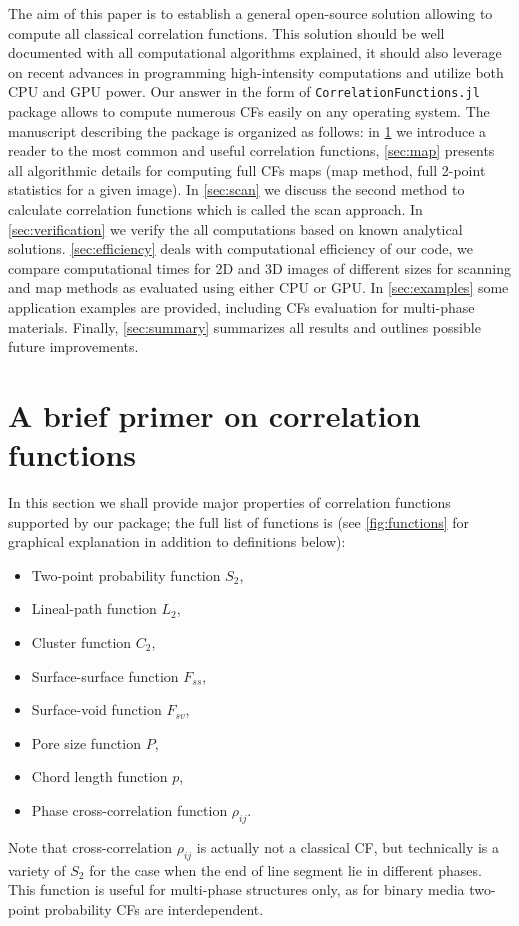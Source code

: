 \documentclass[1p]{elsarticle}
\newcommand{\code}[1]{\colorbox{light-gray}{\texttt{#1}}}
\begin{document}
The aim of this paper is to establish a general open-source solution allowing to
compute all classical correlation functions. This solution should be well
documented with all computational algorithms explained, it should also leverage
on recent advances in programming high-intensity computations and utilize both
CPU and GPU power. Our answer in the form of \code{CorrelationFunctions.jl}
package allows to compute numerous CFs easily on any operating system. The
manuscript describing the package is organized as follows: in \cref{sec:math} we
introduce a reader to the most common and useful correlation functions,
\cref{sec:map} presents all algorithmic details for computing full CFs maps (map
method, full 2-point statistics for a given image). In \cref{sec:scan} we
discuss the second method to calculate correlation functions which is called the
scan approach. In \cref{sec:verification} we verify the all computations based on
known analytical solutions. \cref{sec:efficiency} deals with computational
efficiency of our code, we compare computational times for 2D and 3D images of
different sizes for scanning and map methods as evaluated using either CPU or
GPU. In \cref{sec:examples} some application examples are provided, including
CFs evaluation for multi-phase materials. Finally, \cref{sec:summary} summarizes
all results and outlines possible future improvements.

\section{A brief primer on correlation functions}
\label{sec:math}
In this section we shall provide major properties of correlation functions
supported by our package; the full list of functions is 
(see \cref{fig:functions} for graphical explanation in addition to definitions below):
\begin{itemize}
\item Two-point probability function $S_2$,
\item Lineal-path function $L_2$,
\item Cluster function $C_2$,
\item Surface-surface function $F_{ss}$,
\item Surface-void function $F_{sv}$,
\item Pore size function $P$,
\item Chord length function $p$,
\item Phase cross-correlation function $\rho_{ij}$.
\end{itemize}
Note that cross-correlation $\rho_{ij}$ is actually not a classical CF, but
technically is a variety of $S_2$ for the case when the end of line segment lie
in different phases. This function is useful for multi-phase structures only, as
for binary media two-point probability CFs are interdependent.
\end{document}
